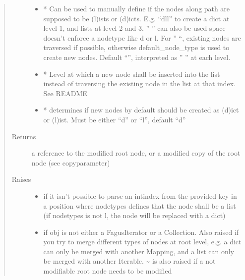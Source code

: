 \documentclass[a4paper,10pt,english]{sphinxmanual}
\begin{document}
\begin{fulllineitems}
\begin{fulllineitems}
\begin{quote}
\begin{description}
\begin{itemize}
\item {}
\sphinxAtStartPar
{} \textendash{} * Can be used to manually define if the nodes along path are supposed to be (l)ists or
(d)icts. E.g. “dll” to create a dict at level 1, and lists at level 2 and 3. ” ” can also be used \sphinxhyphen{}
space doesn’t enforce a node\sphinxhyphen{}type like d or l. For ” “, existing nodes are traversed if possible,
otherwise default\_node\_type is used to create new nodes. Default “”, interpreted as ” ” at each level.

\item {}
\sphinxAtStartPar
{} \textendash{} * Level at which a new node shall be inserted into the list instead of traversing the
existing node in the list at that index. See README

\item {}
\sphinxAtStartPar
{} \textendash{} * determines if new nodes by default should be created as (d)ict or (l)ist. Must be
either “d” or “l”, default “d”

\end{itemize}

\item[{Returns}] \leavevmode
\sphinxAtStartPar
a reference to the modified root node, or a modified copy of the root node (see copy\sphinxhyphen{}parameter)

\item[{Raises}] \leavevmode\begin{itemize}
\item {}
\sphinxAtStartPar
{} \textendash{} if it isn’t possible to parse an int\sphinxhyphen{}index from the provided key in a position where node\sphinxhyphen{}types
    defines that the node shall be a list (if node\sphinxhyphen{}types is not l, the node will be replaced with a dict)

\item {}
\sphinxAtStartPar
{} \textendash{} if obj is not either a FagusIterator or a Collection. Also raised if you try to merge different
    types of nodes at root level, e.g. a dict can only be merged with another Mapping, and a list can only
    be merged with another Iterable. \textasciitilde{} is also raised if a not modifiable root node needs to be modified

\end{itemize}


\end{description}
\end{quote}
\end{fulllineitems}
\end{fulllineitems}
\end{document}
